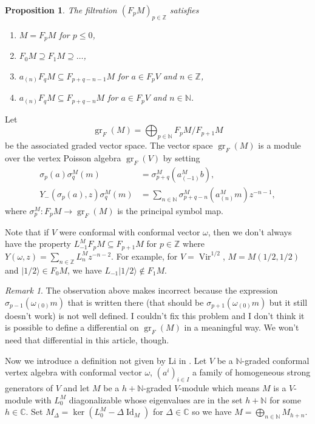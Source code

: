 \documentclass[12pt, reqno]{amsart}
\newtheorem{proposition}[theorem]{Proposition}
\theoremstyle{remark}
\newtheorem{remark}[theorem]{Remark}
\DeclareMathOperator{\Vir}{Vir}
\DeclareMathOperator{\Id}{Id}
\DeclareMathOperator{\gr}{gr}
\newcommand{\vachalf}{|1/2\rangle}
\begin{document}
\begin{proposition}
  \label{prp:4}
  The filtration $(F_pM)_{p \in \mathbb{Z}}$ satisfies
  \begin{enumerate}[label={(\alph*)}]
  \item $M = F_pM$ for $p \le 0$,
  \item $F_0M \supseteq F_1M \supseteq \dots$,
  \item $a_{(n)}F_qM \subseteq F_{p + q - n - 1}M$ for $a \in F_pV$ and $n \in \mathbb{Z}$,
  \item $a_{(n)}F_qM \subseteq F_{p + q - n}M$ for $a \in F_pV$ and $n \in \mathbb{N}$.
  \end{enumerate}
\end{proposition}

Let
\begin{equation*}
  \gr_F(M) = \bigoplus_{p \in \mathbb{N}}F_pM/F_{p + 1}M
\end{equation*}
be the associated graded vector space.
The vector space $\gr_F(M)$ is a module over the vertex Poisson algebra $\gr_F(V)$ by setting
\begin{align*}
  \sigma_p(a)\sigma^M_q(m) &= \sigma^M_{p + q}(a^M_{(-1)}b), \\
  Y_-(\sigma_p(a), z)\sigma^M_q(m) &= \sum_{n \in \mathbb{N}}\sigma^M_{p + q - n}(a^M_{(n)}m)z^{-n - 1},
\end{align*}
where $\sigma^M_p: F_pM \to \gr_F(M)$ is the principal symbol map.

Note that if $V$ were conformal with conformal vector $\omega$, then we don't always have the property $L_{-1}^MF_pM \subseteq F_{p + 1}M$ for $p \in \mathbb{Z}$ where $Y(\omega, z) = \sum_{n \in \mathbb{Z}}L^M_nz^{-n - 2}$.
For example, for $V = \Vir^{1/2}$, $M = M(1/2, 1/2)$ and $\vachalf \in F_0M$, we have $L_{-1}\vachalf \notin F_1M$.

\begin{remark}
  \label{rmk:2}
  The observation above makes \cite[Lemma 3.1.2]{arakawa_remark_2012} incorrect because the expression $\sigma_{p - 1}(\omega_{(0)}m)$ that is written there (that should be $\sigma_{p + 1}(\omega_{(0)}m)$ but it still doesn't work) is not well defined.
  I couldn't fix this problem and I don't think it is possible to define a differential on $\gr_F(M)$ in a meaningful way.
  We won't need that differential in this article, though.
\end{remark}

Now we introduce a definition not given by Li in \cite{li_vertex_2004}.
Let $V$ be a $\mathbb{N}$-graded conformal vertex algebra with conformal vector $\omega$, $(a^i)_{i \in I}$ a family of homogeneous strong generators of $V$ and let $M$ be a $h + \mathbb{N}$-graded $V$-module which means $M$ is a $V$-module with $L_0^M$ diagonalizable whose eigenvalues are in the set $h + \mathbb{N}$ for some $h \in \mathbb{C}$.
Set $M_\Delta = \ker(L^M_0 - \Delta\Id_M)$ for $\Delta \in \mathbb{C}$ so we have $M = \bigoplus_{n \in \mathbb{N}}M_{h + n}$.
\end{document}
